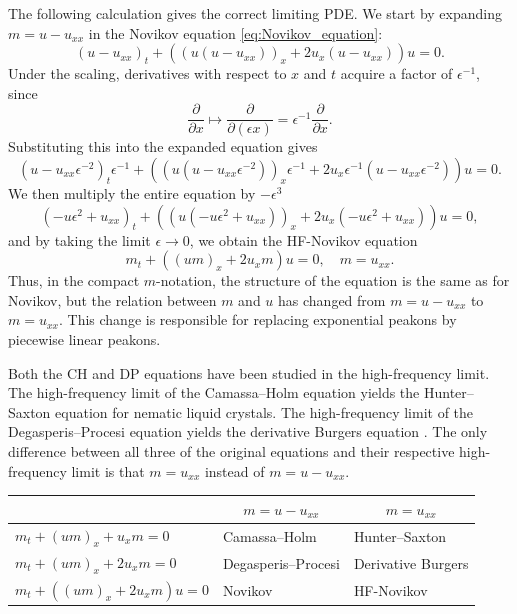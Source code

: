 \documentclass[english,master]{liumaiex}
\theoremstyle{thesisplain}
\theoremstyle{thesisdefinition}
\numberwithin{equation}{section}
\begin{document}
The following calculation gives the correct limiting PDE. We start by expanding $m=u-u_{xx}$ in the Novikov equation \eqref{eq:Novikov_equation}:
\begin{equation}
	(u-u_{xx})_t + ((u(u-u_{xx}))_x + 2u_x(u-u_{xx}))u = 0.
\end{equation}
Under the scaling, derivatives with respect to $x$ and $t$ acquire a factor of $\epsilon^{-1}$, since
\begin{equation}
	\frac{\partial}{\partial x} \mapsto \frac{\partial}{\partial(\epsilon x)} = \epsilon^{-1} \frac{\partial}{\partial x}.
\end{equation}
Substituting this into the expanded equation gives
\begin{equation}
	(u-u_{xx}\epsilon^{-2})_t\epsilon^{-1} + ((u(u-u_{xx}\epsilon^{-2}))_x\epsilon^{-1} + 2u_x\epsilon^{-1}(u-u_{xx}\epsilon^{-2}))u = 0.
\end{equation}
We then multiply the entire equation by $-\epsilon^3$
\begin{equation}
	(-u\epsilon^{2}+u_{xx})_t + ((u(-u\epsilon^{2}+u_{xx}))_x + 2u_x(-u\epsilon^{2}+u_{xx}))u = 0,
\end{equation}
and by taking the limit $\epsilon \rightarrow 0$, we obtain the HF-Novikov equation
\begin{equation} \label{eq:HF-Novikov}
	m_t + ((um)_x + 2u_xm) u = 0,\quad m = u_{xx}.
\end{equation}
Thus, in the compact $m$-notation, the structure of the equation is the same as for Novikov, but the relation between $m$ and $u$ has changed from $m=u-u_{xx}$ to $m=u_{xx}$. This change is responsible for replacing exponential peakons by piecewise linear peakons.

Both the CH and DP equations have been studied in the high-frequency limit.  The high-frequency limit of the Camassa--Holm equation yields the Hunter--Saxton equation \cite{Hunter_1991,Hunter_1994} for nematic liquid crystals. The high-frequency limit of the Degasperis--Procesi equation yields the derivative Burgers equation \cite{Kohlenberg_2007, Lundmark_2008}.  The only difference between all three of the original equations and their respective high-frequency limit is that $m = u_{xx}$ instead of $m = u - u_{xx}$.

\begin{center}
  \begin{tabular}{l|c|c}
    & $m=u-u_{xx}$ & $m=u_{xx}$ \\
    \hline
    $m_t + (um)_x + u_xm = 0$ 
	& \multicolumn{1}{l|}{Camassa--Holm} & \multicolumn{1}{l}{Hunter--Saxton} \\
    \hline
    $m_t + (um)_x + 2u_xm = 0$ 
	& \multicolumn{1}{l|}{Degasperis--Procesi} & \multicolumn{1}{l}{Derivative Burgers} \\
    \hline
    $m_t + ((um)_x + 2u_xm)u = 0$ 
	& \multicolumn{1}{l|}{Novikov} & \multicolumn{1}{l}{HF-Novikov} \\
  \end{tabular}
\end{center}
\end{document}
